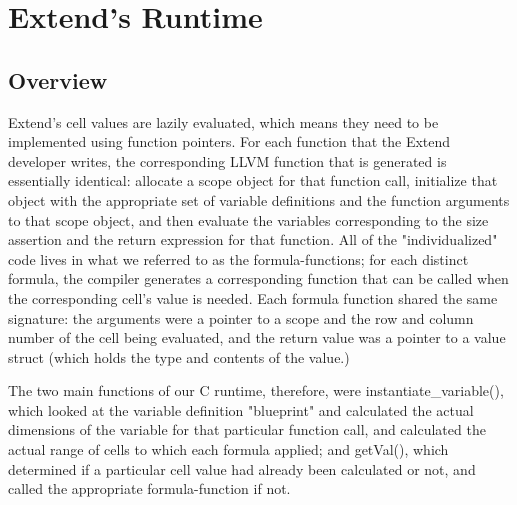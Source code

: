 \chapter{Extend's Runtime}

\section{Overview}
Extend's cell values are lazily evaluated, which means they need to be implemented using function pointers. For each function that the Extend developer writes, the corresponding LLVM function that is generated is essentially identical: allocate a scope object for that function call, initialize that object with the appropriate set of variable definitions and the function arguments to that scope object, and then evaluate the variables corresponding to the size assertion and the return expression for that function. All of the "individualized" code lives in what we referred to as the formula-functions; for each distinct formula, the compiler generates a corresponding function that can be called when the corresponding cell's value is needed. Each formula function shared the same signature: the arguments were a pointer to a scope and the row and column number of the cell being evaluated, and the return value was a pointer to a value struct (which holds the type and contents of the value.)

The two main functions of our C runtime, therefore, were instantiate_variable(), which looked at the variable definition "blueprint" and calculated the actual dimensions of the variable for that particular function call, and calculated the actual range of cells to which each formula applied; and getVal(), which determined if a particular cell value had already been calculated or not, and called the appropriate formula-function if not.
